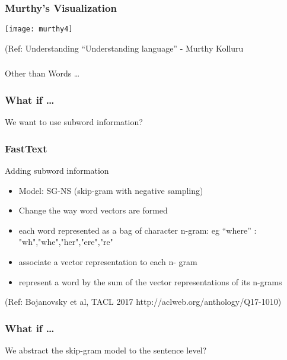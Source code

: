 \begin{frame}[fragile]\frametitle{Murthy's Visualization}

\begin{center}
\texttt{[image: murthy4]}

{\tiny (Ref: Understanding ``Understanding language'' - Murthy Kolluru}

\end{center}

\end{frame}

\begin{frame}[fragile]\frametitle{}

\begin{center}
{\Large Other than Words \ldots}
\end{center}
\end{frame}


\begin{frame}[fragile]\frametitle{What if \ldots}
We want to use subword
information?
\end{frame}

\begin{frame}[fragile]\frametitle{FastText}
Adding subword information
\begin{itemize}
\item  Model: SG-NS (skip-gram with negative sampling)
\item Change the way word vectors are formed
\item  each word represented as a bag of character 
n-gram: eg ``where'' : "wh","whe","her","ere","re"
\item  associate a vector representation to each n-
gram 
\item  represent a word by the sum of the vector 
representations of its n-grams
\end{itemize}

{\tiny (Ref: Bojanovsky et al, TACL 2017 http://aclweb.org/anthology/Q17-1010)}

\end{frame}

\begin{frame}[fragile]\frametitle{What if \ldots}
We abstract the skip-gram 
model to the sentence level?
\end{frame}

